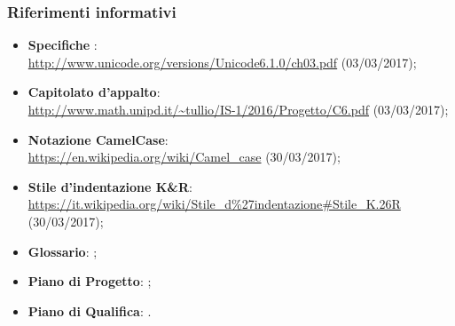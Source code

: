 \documentclass[../NormeDiProgetto.tex]{subfiles}
\begin{document}
			\subsubsection{Riferimenti informativi}	
				\begin{itemize}
					\item \textbf{Specifiche }:\\
					\url{http://www.unicode.org/versions/Unicode6.1.0/ch03.pdf} (03/03/2017);
					\item \textbf{Capitolato d'appalto}:\\
					\url{http://www.math.unipd.it/~tullio/IS-1/2016/Progetto/C6.pdf} (03/03/2017);
					\item \textbf{Notazione CamelCase}:\\
					\url{https://en.wikipedia.org/wiki/Camel_case} (30/03/2017);
					\item \textbf{Stile d'indentazione K\&R}:\\
					\url{https://it.wikipedia.org/wiki/Stile_d\%27indentazione#Stile_K.26R} (30/03/2017);
					\item \textbf{Glossario}: \glossariov;
					\item \textbf{Piano di Progetto}: \pianodiprogettov;
					\item \textbf{Piano di Qualifica}: \pianodiqualificav.
				\end{itemize}
\end{document}
